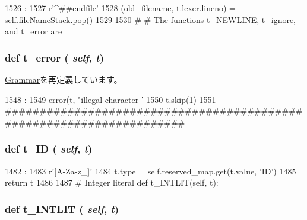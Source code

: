 \begin{DoxyCode}
1526                           :
1527         r'^\#\#endfile'
1528         (old_filename, t.lexer.lineno) = self.fileNameStack.pop()
1529 
1530     #
    # The functions t_NEWLINE, t_ignore, and t_error are
\end{DoxyCode}
\hypertarget{classisa__parser_1_1ISAParser_aa36cfdc4c544b59202ebc57d37d62a31}{
\subsubsection[{t\_\-error}]{\setlength{\rightskip}{0pt plus 5cm}def t\_\-error ( {\em self}, \/   {\em t})}}
\label{classisa__parser_1_1ISAParser_aa36cfdc4c544b59202ebc57d37d62a31}


\hyperlink{classm5_1_1util_1_1grammar_1_1Grammar_aa36cfdc4c544b59202ebc57d37d62a31}{Grammar}を再定義しています。


\begin{DoxyCode}
1548                         :
1549         error(t, "illegal character '%
1550         t.skip(1)
1551 
    #####################################################################
\end{DoxyCode}
\hypertarget{classisa__parser_1_1ISAParser_a9466cde47ec1f3f6a3f63f4c532198e6}{
\subsubsection[{t\_\-ID}]{\setlength{\rightskip}{0pt plus 5cm}def t\_\-ID ( {\em self}, \/   {\em t})}}
\label{classisa__parser_1_1ISAParser_a9466cde47ec1f3f6a3f63f4c532198e6}



\begin{DoxyCode}
1482                      :
1483         r'[A-Za-z_]\w*'
1484         t.type = self.reserved_map.get(t.value, 'ID')
1485         return t
1486 
1487     # Integer literal
    def t_INTLIT(self, t):
\end{DoxyCode}
\hypertarget{classisa__parser_1_1ISAParser_a8f388de6dbecec81beb34803661a82df}{
\subsubsection[{t\_\-INTLIT}]{\setlength{\rightskip}{0pt plus 5cm}def t\_\-INTLIT ( {\em self}, \/   {\em t})}}
\label{classisa__parser_1_1ISAParser_a8f388de6dbecec81beb34803661a82df}



